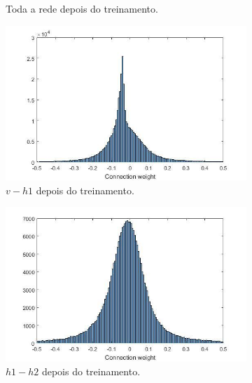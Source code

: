 \documentclass{article}
\begin{document}
\begin{figure}[h!]
\begin{subfigure}{0.5\textwidth}
                    \caption{Toda a rede depois do treinamento.}
                \end{subfigure}
                \begin{subfigure}{0.5\textwidth}
                    \centering
                    \includegraphics[scale=0.3]{Images/Weights distribution (3).png}
                    \caption{$v - h1$ depois do treinamento.}
                \end{subfigure}
                \begin{subfigure}{0.5\textwidth}
                    \centering
                    \includegraphics[scale=0.3]{Images/Weights distribution (4).png}
                    \caption{$h1 - h2$ depois do treinamento.}
                \end{subfigure}
                \begin{center}
                    \begin{subfigure}{0.5\textwidth}
                        \centering

\end{subfigure}
\end{center}
\end{figure}
\end{document}
